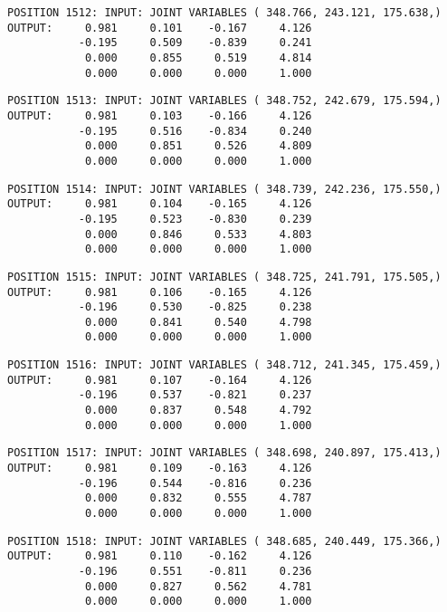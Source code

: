 \begin{verbatim}
POSITION 1512: INPUT: JOINT VARIABLES ( 348.766, 243.121, 175.638,)
OUTPUT:     0.981     0.101    -0.167     4.126
           -0.195     0.509    -0.839     0.241
            0.000     0.855     0.519     4.814
            0.000     0.000     0.000     1.000
\end{verbatim} \pagebreak[1]\begin{verbatim}
POSITION 1513: INPUT: JOINT VARIABLES ( 348.752, 242.679, 175.594,)
OUTPUT:     0.981     0.103    -0.166     4.126
           -0.195     0.516    -0.834     0.240
            0.000     0.851     0.526     4.809
            0.000     0.000     0.000     1.000
\end{verbatim} \pagebreak[1]\begin{verbatim}
POSITION 1514: INPUT: JOINT VARIABLES ( 348.739, 242.236, 175.550,)
OUTPUT:     0.981     0.104    -0.165     4.126
           -0.195     0.523    -0.830     0.239
            0.000     0.846     0.533     4.803
            0.000     0.000     0.000     1.000
\end{verbatim} \pagebreak[1]\begin{verbatim}
POSITION 1515: INPUT: JOINT VARIABLES ( 348.725, 241.791, 175.505,)
OUTPUT:     0.981     0.106    -0.165     4.126
           -0.196     0.530    -0.825     0.238
            0.000     0.841     0.540     4.798
            0.000     0.000     0.000     1.000
\end{verbatim} \pagebreak[1]\begin{verbatim}
POSITION 1516: INPUT: JOINT VARIABLES ( 348.712, 241.345, 175.459,)
OUTPUT:     0.981     0.107    -0.164     4.126
           -0.196     0.537    -0.821     0.237
            0.000     0.837     0.548     4.792
            0.000     0.000     0.000     1.000
\end{verbatim} \pagebreak[1]\begin{verbatim}
POSITION 1517: INPUT: JOINT VARIABLES ( 348.698, 240.897, 175.413,)
OUTPUT:     0.981     0.109    -0.163     4.126
           -0.196     0.544    -0.816     0.236
            0.000     0.832     0.555     4.787
            0.000     0.000     0.000     1.000
\end{verbatim} \pagebreak[1]\begin{verbatim}
POSITION 1518: INPUT: JOINT VARIABLES ( 348.685, 240.449, 175.366,)
OUTPUT:     0.981     0.110    -0.162     4.126
           -0.196     0.551    -0.811     0.236
            0.000     0.827     0.562     4.781
            0.000     0.000     0.000     1.000
\end{verbatim} \pagebreak[1]\begin{verbatim}

\end{verbatim}
